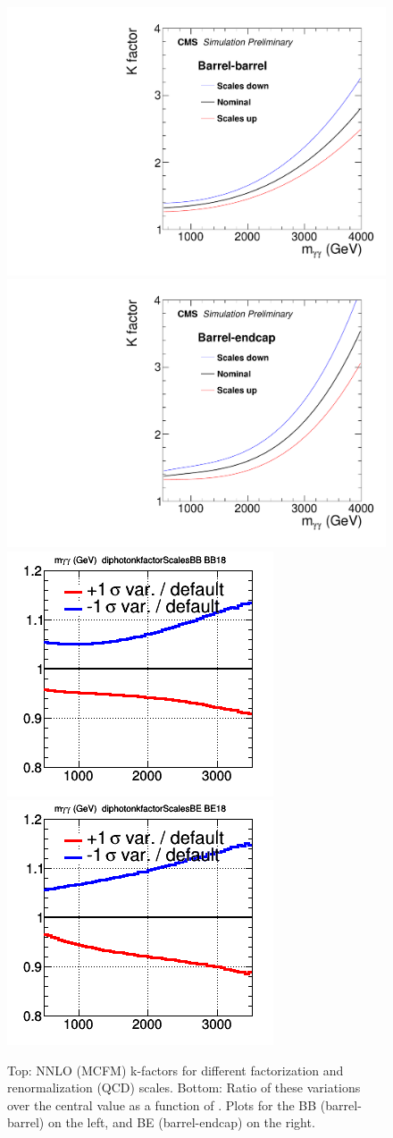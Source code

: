 \begin{figure}[!htbp]
\centering
\caption{Top: NNLO (MCFM) k-factors for different factorization and renormalization (QCD) scales. Bottom: Ratio of these variations over the central value as a function of \mgg. Plots for the BB (barrel-barrel) on the left, and BE (barrel-endcap) on the right.}
\includegraphics[width=0.4\linewidth]{fig/kfactorScaleVariations_BB_preliminary_NNPDF.pdf} %
\includegraphics[width=0.4\linewidth]{fig/kfactorScaleVariations_BE_preliminary_NNPDF.pdf}
\includegraphics[width=0.4\linewidth]{fig/spectra__diphotonkfactorScalesBB_BB18_ADDGRW.png}
\includegraphics[width=0.4\linewidth]{fig/spectra__diphotonkfactorScalesBE_BE18_ADDGRW.png}
\label{Fig:sys_fs}
\end{figure}


